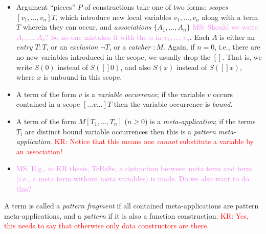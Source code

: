 \documentclass[letterpaper,11pt]{article}
\newcommand{\KR}[1]{\textcolor{red}{KR: #1}}
\newcommand{\MS}[1]{\textcolor{violet}{MS: #1}}
\begin{document}
\begin{definition}
\begin{itemize}
    \MS{Here comes a really general question: How do data and function constructors/constructions
      relate to constructor and defined symbols in term rewriting (To clarify: A symbol is
      \emph{defined} wrt to a set of rules, if it occurs at the root of a left-hand side of a
      rule. The other symbols are constructors.) I have a feeling, that this is actually similar?
      If so, I may argue, that the distinction is easily computable and is maybe not core?  } \KR{A:
      Yes, one can argue this. Not sure what the right answer is.}  \MS{I'd go for simpler. Maybe we
      can discuss this on the call?}  \MS{Conclusion: For implementation it is easier to declare
      it. It is computable though.}

  \item Argument ``pieces'' $P$ of constructions take one of two forms: \emph{scopes}
    $[v_1,…,v_n]T$, which introduce new local variables $v_1,…,v_n$ along with a term $T$ wherein
    they can occur, and \emph{associations} $\{A_1,…,A_n\}$ \MS{Should we write $A_1, \ldots, A_k$?
      So no one mistakes it with the $n$ in $v_1, \ldots, v_n$}. Each $A$ is either an \emph{entry}
    $T:T$, or an \emph{exclusion} $¬T$, or a \emph{catcher} ${:}M$. Again, if $n=0$, i.e., there are
    no new variables introduced in the scope, we usually drop the $[]$. That is, we write $S(0)$
    instead of $S([]0)$, and also $S(x)$ instead of $S([]x)$, where $x$ is unbound in this scope.

  \item A term of the form $v$ is a \emph{variable occurrence}; if the variable $v$ occurs contained
    in a scope $[…v…]T$ then the variable occurrence is \emph{bound}.

  \item A term of the form $M[T_1,…,T_n]$ ($n≥0$) is a \emph{meta-application}; if the terms $T_i$
    are distinct bound variable occurrences then this is a \emph{pattern
      meta-application}. \KR{Notice that this means one \emph{cannot} substitute a variable by an
      association!}

  \item  \MS{E.g., in KR thesis, TeReSe, a distinction between meta term and term (i.e., a meta term without
     meta variables) is made. Do we also want to do this?}
  \end{itemize}
  A term is called a \emph{pattern fragment} if all contained meta-applications are pattern
  meta-applications, and a \emph{pattern} if it is also a function construction. \KR{Yes, this needs
    to say that otherwise only data constructors are there.}
\end{definition}
\end{document}
